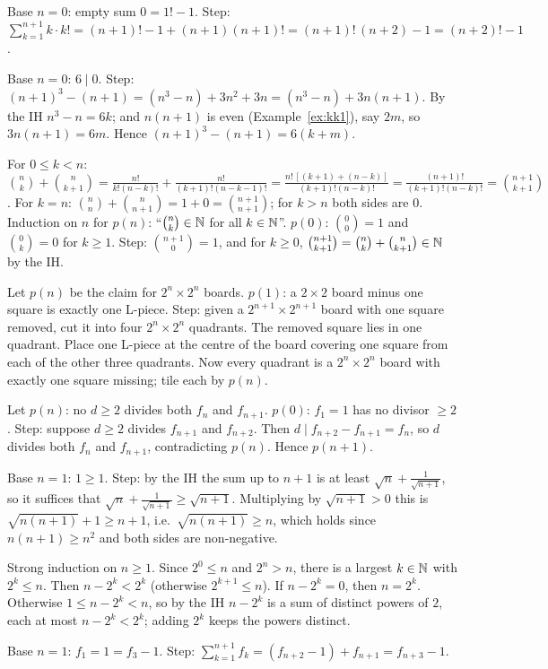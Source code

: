  Base $n=0$: empty sum $0=1!-1$. Step: $\sum_{k=1}^{n+1}k\cdot k!=(n+1)!-1+(n+1)(n+1)!=(n+1)!\,(n+2)-1=(n+2)!-1$.

 Base $n=0$: $6\mid0$. Step: $(n+1)^3-(n+1)=(n^3-n)+3n^2+3n=(n^3-n)+3n(n+1)$. By the IH $n^3-n=6k$; and $n(n+1)$ is even (Example~\ref{ex:kk1}), say $2m$, so $3n(n+1)=6m$. Hence $(n+1)^3-(n+1)=6(k+m)$.

 For $0\le k<n$: $\binom nk+\binom n{k+1}=\frac{n!}{k!(n-k)!}+\frac{n!}{(k+1)!(n-k-1)!}=\frac{n!\,[(k+1)+(n-k)]}{(k+1)!(n-k)!}=\frac{(n+1)!}{(k+1)!(n-k)!}=\binom{n+1}{k+1}$. For $k=n$: $\binom nn+\binom n{n+1}=1+0=\binom{n+1}{n+1}$; for $k>n$ both sides are $0$. Induction on $n$ for $p(n)$: ``$\binom nk\in\mathbb{N}$ for all $k\in\mathbb{N}$''. $p(0)$: $\binom00=1$ and $\binom0k=0$ for $k\ge1$. Step: $\binom{n+1}0=1$, and for $k\ge0$, $\binom{n+1}{k+1}=\binom nk+\binom n{k+1}\in\mathbb{N}$ by the IH.

 Let $p(n)$ be the claim for $2^n\times2^n$ boards. $p(1)$: a $2\times2$ board minus one square is exactly one L-piece. Step: given a $2^{n+1}\times2^{n+1}$ board with one square removed, cut it into four $2^n\times2^n$ quadrants. The removed square lies in one quadrant. Place one L-piece at the centre of the board covering one square from each of the other three quadrants. Now every quadrant is a $2^n\times2^n$ board with exactly one square missing; tile each by $p(n)$.

 Let $p(n)$: no $d\ge2$ divides both $f_n$ and $f_{n+1}$. $p(0)$: $f_1=1$ has no divisor $\ge2$. Step: suppose $d\ge2$ divides $f_{n+1}$ and $f_{n+2}$. Then $d\mid f_{n+2}-f_{n+1}=f_n$, so $d$ divides both $f_n$ and $f_{n+1}$, contradicting $p(n)$. Hence $p(n+1)$.

 Base $n=1$: $1\ge1$. Step: by the IH the sum up to $n+1$ is at least $\sqrt n+\frac1{\sqrt{n+1}}$, so it suffices that $\sqrt n+\frac1{\sqrt{n+1}}\ge\sqrt{n+1}$. Multiplying by $\sqrt{n+1}>0$ this is $\sqrt{n(n+1)}+1\ge n+1$, i.e.\ $\sqrt{n(n+1)}\ge n$, which holds since $n(n+1)\ge n^2$ and both sides are non-negative.

 Strong induction on $n\ge1$. Since $2^0\le n$ and $2^n>n$, there is a largest $k\in\mathbb{N}$ with $2^k\le n$. Then $n-2^k<2^k$ (otherwise $2^{k+1}\le n$). If $n-2^k=0$, then $n=2^k$. Otherwise $1\le n-2^k<n$, so by the IH $n-2^k$ is a sum of distinct powers of $2$, each at most $n-2^k<2^k$; adding $2^k$ keeps the powers distinct.

 Base $n=1$: $f_1=1=f_3-1$. Step: $\sum_{k=1}^{n+1}f_k=(f_{n+2}-1)+f_{n+1}=f_{n+3}-1$.

